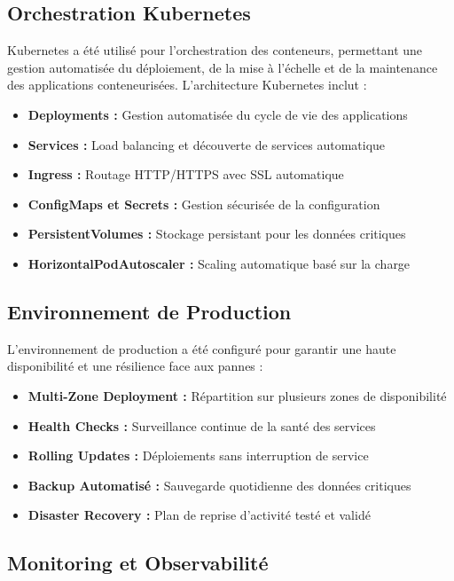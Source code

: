 \subsection{Orchestration Kubernetes}

Kubernetes a été utilisé pour l'orchestration des conteneurs, permettant une gestion automatisée du déploiement, de la mise à l'échelle et de la maintenance des applications conteneurisées. L'architecture Kubernetes inclut :

\begin{itemize}
    \item \textbf{Deployments :} Gestion automatisée du cycle de vie des applications
    \item \textbf{Services :} Load balancing et découverte de services automatique
    \item \textbf{Ingress :} Routage HTTP/HTTPS avec SSL automatique
    \item \textbf{ConfigMaps et Secrets :} Gestion sécurisée de la configuration
    \item \textbf{PersistentVolumes :} Stockage persistant pour les données critiques
    \item \textbf{HorizontalPodAutoscaler :} Scaling automatique basé sur la charge
\end{itemize}

\subsection{Environnement de Production}

L'environnement de production a été configuré pour garantir une haute disponibilité et une résilience face aux pannes :

\begin{itemize}
    \item \textbf{Multi-Zone Deployment :} Répartition sur plusieurs zones de disponibilité
    \item \textbf{Health Checks :} Surveillance continue de la santé des services
    \item \textbf{Rolling Updates :} Déploiements sans interruption de service
    \item \textbf{Backup Automatisé :} Sauvegarde quotidienne des données critiques
    \item \textbf{Disaster Recovery :} Plan de reprise d'activité testé et validé
\end{itemize}

\subsection{Monitoring et Observabilité}


